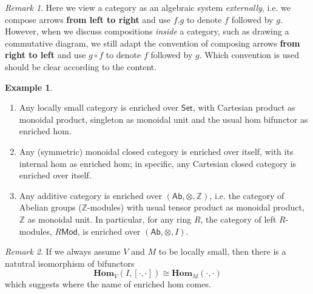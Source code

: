 \documentclass{article}
\theoremstyle{definition}
\newtheorem*{eg}{Example}
\theoremstyle{remark}
\newtheorem*{remark}{Remark}
\begin{document}
\begin{remark}
Here we view a category as an algebraic system \textit{externally}, i.e. we compose arrows \textbf{from left to right} and use $f.g$ to denote $f$ followed by $g$. However, when we discuss compositions \textit{inside} a category, such as drawing a commutative diagram, we still adapt the convention of composing arrows \textbf{from right to left} and use $g \circ f$ to denote $f$ followed by $g$. Which convention is used should be clear according to the content.
\end{remark}

\begin{eg}
\begin{enumerate}
    \item Any locally small category is enriched over $\mathsf{Set}$, with Cartesian product as monoidal product, singleton as monoidal unit and the usual hom bifunctor as enriched hom.
    \item Any (symmetric) monoidal closed category is enriched over itself, with its internal hom as enriched hom; in specific, any Cartesian closed category is enriched over itself.
    \item Any additive category is enriched over $(\mathsf{Ab},\otimes,\mathbb{Z})$, i.e. the category of Abelian groups ($\mathbb{Z}$-modules) with usual tensor product as monoidal product, $\mathbb{Z} $ as monoidal unit. In particular, for any ring $R$, the category of left $R$-modules, $R\mathsf{Mod}$, is enriched over $(\mathsf{Ab},\otimes,I)$.
\end{enumerate}
\end{eg}

\begin{remark}
If we always assume $V$ and $M$ to be locally small, then there is a natutral isomorphism of bifunctors $$ \mathbf{Hom}_V(I,[\cdot,\cdot]) \cong \mathbf{Hom}_M(\cdot,\cdot)$$ which suggests where the name of enriched hom comes.
\end{remark}
\end{document}
